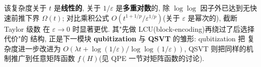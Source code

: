 \documentclass[utf8]{article} %
\numberwithin{equation}{section}   %
\newtheorem{Note}{\hskip 2em {\color{red} 注}}[subsection]
\begin{document}
\begin{Note}[最优性与对下一模块的展望]
    该复杂度关于 $t$ 是\textbf{线性的}, 关于 $1/\varepsilon$ 是\textbf{多重对数}的, 
    除 $\log\log$ 因子外已达到无快速前推下界 $\Omega(t)$; 对比乘积公式
    $O(t^{1+1/p}/\varepsilon^{1/p})$(关于 $\varepsilon$ 是幂次的), 截断 Taylor 级数
    在 $\varepsilon\to0$ 时显著更优. 其"先做 LCU(block-encoding)再绕过了后选择代价"的
    结构, 正是下一模块 \textbf{qubitization} 与 \textbf{QSVT} 的雏形: qubitization 把
    复杂度进一步改进为 $O(\lambda t + \log(1/\varepsilon)/\log\log(1/\varepsilon))$,
    QSVT 则把同样的机制推广到任意矩阵函数 $f(H)$(见 QPE 一节对矩阵函数的讨论).
\end{Note}
\end{document}
